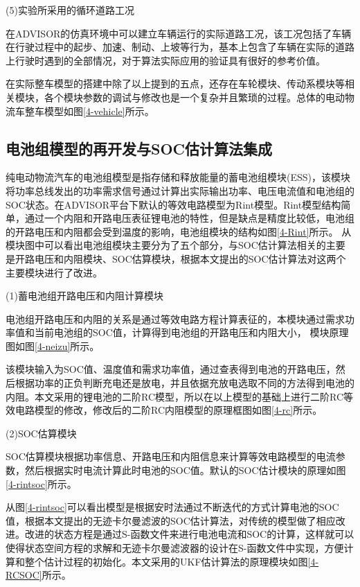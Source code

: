 (5)实验所采用的循环道路工况

在ADVISOR的仿真环境中可以建立车辆运行的实际道路工况，该工况包括了车辆在行驶过程中的起步、加速、制动、上坡等行为，基本上包含了车辆在实际的道路上行驶时遇到的全部情况，对于算法实际应用的验证具有很好的参考价值。


在实际整车模型的搭建中除了以上提到的五点，还存在车轮模块、传动系模块等相关模块，各个模块参数的调试与修改也是一个复杂并且繁琐的过程。总体的电动物流车整车模型如图\ref{4-vehicle}所示。

\subsection{电池组模型的再开发与SOC估计算法集成}
纯电动物流汽车的电池组模型是指存储和释放能量的蓄电池组模块(ESS)，该模块将功率总线发出的功率需求信号通过计算出实际输出功率、电压电流值和电池组的SOC状态。在ADVISOR平台下默认的等效电路模型为Rint模型。Rint模型结构简单，通过一个内阻和开路电压表征锂电池的特性，但是缺点是精度比较低，电池组的开路电压和内阻都会受到温度的影响，电池组模块的结构如图\ref{4-Rint}所示。
从模块图中可以看出电池组模块主要分为了五个部分，与SOC估计算法相关的主要是开路电压和内阻模块、SOC估算模块，根据本文提出的SOC估计算法对这两个主要模块进行了改进。

(1)蓄电池组开路电压和内阻计算模块

电池组开路电压和内阻的关系是通过等效电路方程计算表征的，本模块通过需求功率值和当前电池组的SOC值，计算得到电池组的开路电压和内阻大小， 模块原理图如图\ref{4-neizu}所示。

该模块输入为SOC值、温度值和需求功率值，通过查表得到电池的开路电压，然后根据功率的正负判断充电还是放电，并且依据充放电选取不同的方法得到电池的内阻。本文采用的锂电池的二阶RC模型，所以在以上模型的基础上进行二阶RC等效电路模型的修改，修改后的二阶RC内阻模型的原理框图如图\ref{4-rc}所示。

(2)SOC估算模块

SOC估算模块根据功率信息、开路电压和内阻信息来计算等效电路模型的电流参数，然后根据实时电流计算此时电池的SOC值。默认的SOC估计模块的原理如图\ref{4-rintsoc}所示。

从图\ref{4-rintsoc}可以看出模型是根据安时法通过不断迭代的方式计算电池的SOC值，根据本文提出的无迹卡尔曼滤波的SOC估计算法，对传统的模型做了相应改进。改进的状态方程是通过S-函数文件来进行电池电流和SOC的计算，这样就可以使得状态空间方程的求解和无迹卡尔曼滤波器的设计在S-函数文件中实现，方便计算和整个估计过程的初始化。本文采用的UKF估计算法的原理模块如图\ref{4-RCSOC}所示。

